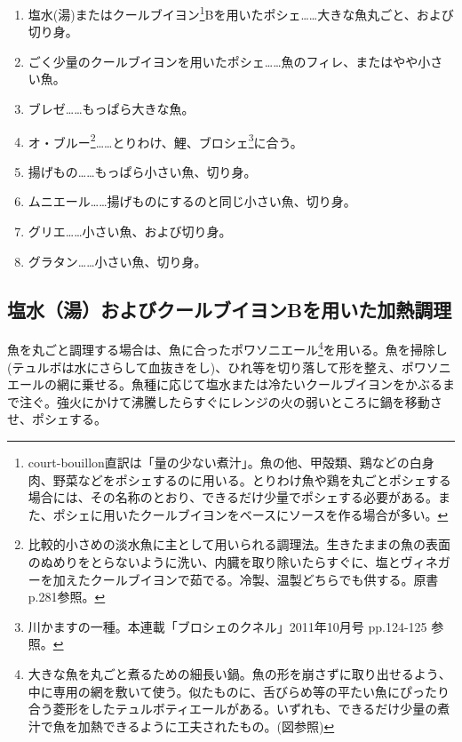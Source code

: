 \begin{enumerate}
\def\labelenumi{\arabic{enumi}.}
\item
  塩水(湯)またはクールブイヨン\footnote{court-bouillon直訳は「量の少ない煮汁」。魚の他、甲殻類、鶏などの白身肉、野菜などをポシェするのに用いる。とりわけ魚や鶏を丸ごとポシェする場合には、その名称のとおり、できるだけ少量でポシェする必要がある。また、ポシェに用いたクールブイヨンをベースにソースを作る場合が多い。}Bを用いたポシェ\ldots{}\ldots{}大きな魚丸ごと、および切り身。
\item
  ごく少量のクールブイヨンを用いたポシェ\ldots{}\ldots{}魚のフィレ、またはやや小さい魚。
\item
  ブレゼ\ldots{}\ldots{}もっぱら大きな魚。
\item
  オ・ブルー\footnote{比較的小さめの淡水魚に主として用いられる調理法。生きたままの魚の表面のぬめりをとらないように洗い、内臓を取り除いたらすぐに、塩とヴィネガーを加えたクールブイヨンで茹でる。冷製、温製どちらでも供する。原書p.281参照。}\ldots{}\ldots{}とりわけ、鯉、ブロシェ\footnote{川かますの一種。本連載「ブロシェのクネル」2011年10月号
    pp.124-125 参照。}に合う。
\item
  揚げもの\ldots{}\ldots{}もっぱら小さい魚、切り身。
\item
  ムニエール\ldots{}\ldots{}揚げものにするのと同じ小さい魚、切り身。
\item
  グリエ\ldots{}\ldots{}小さい魚、および切り身。
\item
  グラタン\ldots{}\ldots{}小さい魚、切り身。
\end{enumerate}

\hypertarget{ux5869ux6c34ux6e6fux304aux3088ux3073ux30afux30fcux30ebux30d6ux30a4ux30e8ux30f3bux3092ux7528ux3044ux305fux52a0ux71b1ux8abfux7406}{%
\subsection{塩水（湯）およびクールブイヨンBを用いた加熱調理}\label{ux5869ux6c34ux6e6fux304aux3088ux3073ux30afux30fcux30ebux30d6ux30a4ux30e8ux30f3bux3092ux7528ux3044ux305fux52a0ux71b1ux8abfux7406}}

魚を丸ごと調理する場合は、魚に合ったポワソニエール\footnote{大きな魚を丸ごと煮るための細長い鍋。魚の形を崩さずに取り出せるよう、中に専用の網を敷いて使う。似たものに、舌びらめ等の平たい魚にぴったり合う菱形をしたテュルボティエールがある。いずれも、できるだけ少量の煮汁で魚を加熱できるように工夫されたもの。(図参照)}を用いる。魚を掃除し(テュルボは水にさらして血抜きをし)、ひれ等を切り落して形を整え、ポワソニエールの網に乗せる。魚種に応じて塩水または冷たいクールブイヨンをかぶるまで注ぐ。強火にかけて沸騰したらすぐにレンジの火の弱いところに鍋を移動させ、ポシェする。

